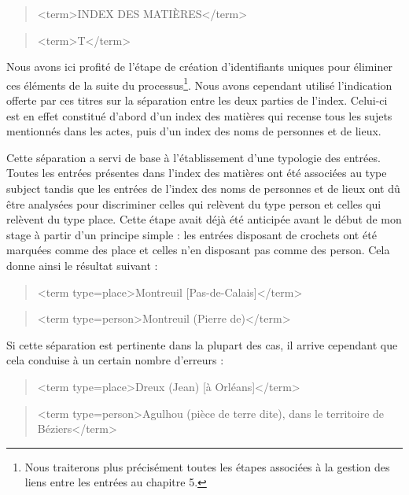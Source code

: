 \documentclass[a4paper,12pt,twoside]{book}
\begin{document}
	\begin{quotation}
		<term>INDEX DES MATIÈRES</term>
	\end{quotation}

	\begin{quotation}
		<term>T</term>
	\end{quotation}

	\noindent Nous avons ici profité de l'étape de création d'identifiants uniques pour éliminer ces éléments de la suite du processus\footnote{Nous traiterons plus précisément toutes les étapes associées à la gestion des liens entre les entrées au chapitre 5.}. Nous avons cependant utilisé l'indication offerte par ces titres sur la séparation entre les deux parties de l'index. Celui-ci est en effet constitué d'abord d'un index des matières qui recense tous les sujets mentionnés dans les actes, puis d'un index des noms de personnes et de lieux. 
	
	Cette séparation a servi de base à l'établissement d'une typologie des entrées. Toutes les entrées présentes dans l'index des matières ont été associées au type \og subject\fg{} tandis que les entrées de l'index des noms de personnes et de lieux ont dû être analysées pour discriminer celles qui relèvent du type \og person\fg{} et celles qui relèvent du type \og place\fg{}. Cette étape avait déjà été anticipée avant le début de mon stage à partir d'un principe simple : les entrées disposant de crochets ont été marquées comme des \og place\fg{} et celles n'en disposant pas comme des \og person\fg{}. Cela donne ainsi le résultat suivant : 
	
	\begin{quotation}
		<term type=\textquotesingle place\textquotesingle >Montreuil [Pas-de-Calais]</term>
	\end{quotation}

	\begin{quotation}
		<term type=\textquotesingle person\textquotesingle >Montreuil (Pierre de)</term>
	\end{quotation}

	\noindent Si cette séparation est pertinente dans la plupart des cas, il arrive cependant que cela conduise à un certain nombre d'erreurs :
	
	\begin{quotation}
		<term type=\textquotesingle place\textquotesingle >Dreux (Jean) [à Orléans]</term>
	\end{quotation}
	
	\begin{quotation}
		<term type=\textquotesingle person\textquotesingle >Agulhou (pièce de terre dite), dans le territoire de
			Béziers</term>
	\end{quotation}
	
\end{document}
